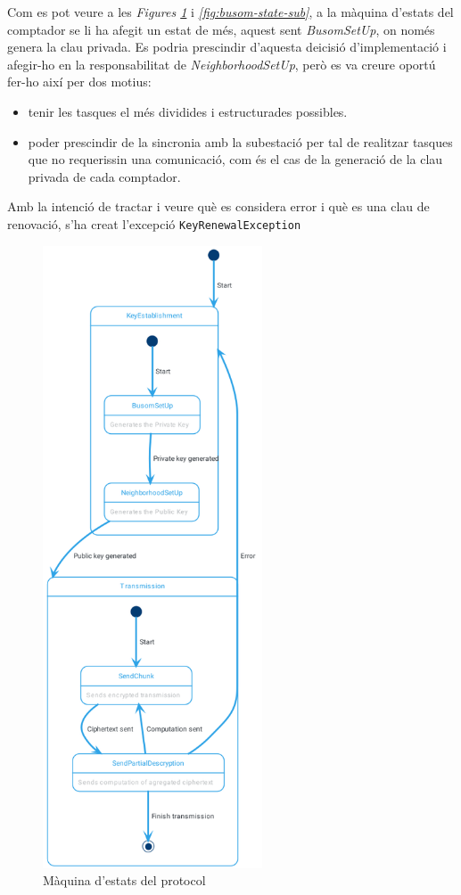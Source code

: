 Com es pot veure a les \textit{Figures \ref{fig:busom-state}} i  \textit{\ref{fig:busom-state-sub}}, a la màquina d'estats del comptador se li ha afegit un estat de més, aquest sent \textit{BusomSetUp}, on només genera la clau privada. Es podria prescindir d'aquesta deicisió d'implementació i afegir-ho en la responsabilitat de \textit{NeighborhoodSetUp}, però es va creure oportú fer-ho així per dos motius:
\begin{itemize}
	\item tenir les tasques el més dividides i estructurades possibles. 
	\item poder prescindir de la sincronia amb la subestació per tal de realitzar tasques que no requerissin una comunicació, com és el cas de la generació de la clau privada de cada comptador.
\end{itemize}
Amb la intenció de tractar i veure què es considera error i què es una clau de renovació, s'ha creat l'excepció \texttt{KeyRenewalException}
\begin{figure}[H]
	\centering
	\includegraphics[width=6.5cm]{classes/busomstatemeter.png}
	\caption{Màquina d'estats del protocol \cite{busom}}
	\label{fig:busom-state}
\end{figure}
